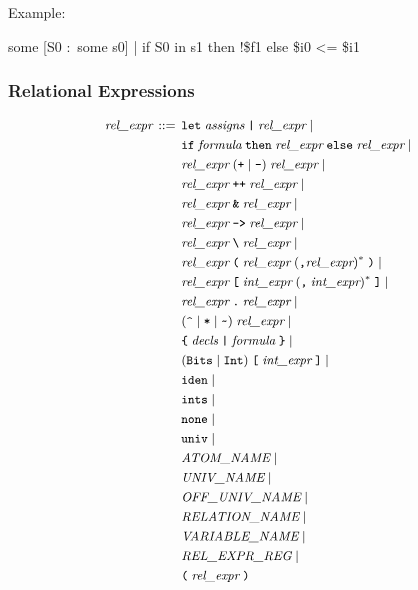 \documentclass[a4paper,12pt]{article}
\begin{document}
Example:

\pre
\ttfamily\small
some [S0 :~some s0] | if S0 in s1 then !\$f1 else \$i0 <= \$i1
\post

\subsubsection{Relational Expressions}
\label{relational-expressions}

$$\small\begin{aligned}
\textit{rel\_expr} \,::=\, {}
    & \verb|let|\; \textit{assigns}\; \verb!|!\; \textit{rel\_expr} \mid {} \\
    & \verb|if|\; \textit{formula}\; \verb|then|\; \textit{rel\_expr}\; \verb|else|\; \textit{rel\_expr} \mid {} \\
    & \textit{rel\_expr}\; (\verb|+| \mid \verb|-|)\; \textit{rel\_expr} \mid {} \\
    & \textit{rel\_expr}\; \verb|++|\; \textit{rel\_expr} \mid {} \\
    & \textit{rel\_expr}\; \verb|&|\; \textit{rel\_expr} \mid {} \\
    & \textit{rel\_expr}\; \verb|->|\; \textit{rel\_expr} \mid {} \\
    & \textit{rel\_expr}\; \verb|\|\; \textit{rel\_expr} \mid {} \\
    & \textit{rel\_expr}\; \verb|(|\; \textit{rel\_expr}\; (\verb|,| \textit{rel\_expr})^*\; \verb|)| \mid {} \\
    & \textit{rel\_expr}\; \verb|[|\; \textit{int\_expr}\; (\verb|,|\; \textit{int\_expr})^*\; \verb|]| \mid {} \\
    & \textit{rel\_expr}\; \verb|.|\; \textit{rel\_expr} \mid {} \\
    & (\verb|^| \mid \verb|*| \mid \verb|~|)\; \textit{rel\_expr} \mid {} \\
    & \verb|{|\; \textit{decls}\; \verb!|!\; \textit{formula}\; \verb|}| \mid {} \\
    & (\verb|Bits| \mid \verb|Int|)\; \verb|[|\; \textit{int\_expr} \;\verb|]| \mid {} \\
    & \verb|iden| \mid {} \\
    & \verb|ints| \mid {} \\
    & \verb|none| \mid {} \\
    & \verb|univ| \mid {} \\
    & \textit{ATOM\_NAME} \mid {} \\
    & \textit{UNIV\_NAME} \mid {} \\
    & \textit{OFF\_UNIV\_NAME} \mid {} \\
    & \textit{RELATION\_NAME} \mid {} \\
    & \textit{VARIABLE\_NAME} \mid {} \\
    & \textit{REL\_EXPR\_REG} \mid {} \\
    & \verb|(|\; \textit{rel\_expr}\; \verb|)| 
\end{aligned}$$
\end{document}
